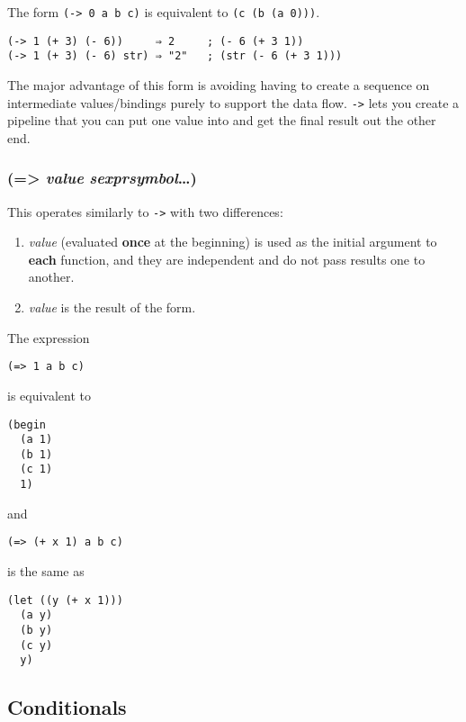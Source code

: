 \documentclass{article}
\begin{document}
The form \verb|(-> 0 a b c)| is equivalent to \verb|(c (b (a 0)))|.

\begin{verbatim}
(-> 1 (+ 3) (- 6))     ⇒ 2     ; (- 6 (+ 3 1))
(-> 1 (+ 3) (- 6) str) ⇒ "2"   ; (str (- 6 (+ 3 1)))
\end{verbatim}

The major advantage of this form is avoiding having to create a sequence on intermediate
values/bindings purely to support the data flow. \verb|->| lets you create a
pipeline that you can put one value into and get the final result out the other end.

\subsubsection{(=\textgreater{} \emph{value} \emph{sexpr}\textbar{}\emph{symbol}\ldots{})}

This operates similarly to \verb|->| with two differences:

\begin{enumerate}
\item \emph{value} (evaluated \textbf{once} at the beginning) is used as the initial argument
  to \textbf{each} function, and they are independent and do not pass results one to another.
\item \emph{value} is the result of the form.
\end{enumerate}

The expression

\begin{verbatim}
(=> 1 a b c)
\end{verbatim}

is equivalent to

\begin{verbatim}
(begin
  (a 1)
  (b 1)
  (c 1)
  1)
\end{verbatim}

and

\begin{verbatim}
(=> (+ x 1) a b c)
\end{verbatim}

is the same as

\begin{verbatim}(let ((y (+ x 1)))
  (a y)
  (b y)
  (c y)
  y)
\end{verbatim}

\subsection{Conditionals}\label{sec:conditionals}
\end{document}
